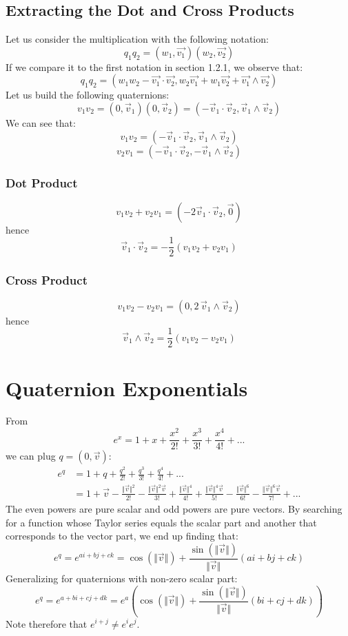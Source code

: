 \documentclass[10pt,a4paper]{article}
\begin{document}
\subsection{Extracting the Dot and Cross Products}
Let us consider the multiplication with the following notation: 
$$
q_1q_2 = (w_1,\vec{v_1})(w_2,\vec{v_2})
$$
If we compare it to the first notation in section 1.2.1, we observe that:
$$
\boxed{
q_1q_2 = (w_1w_2 - \vec{v_1}\cdot\vec{v_2}, w_2\vec{v_1} + w_1\vec{v_2} + \vec{v_1}\wedge\vec{v_2})
}
$$
Let us build the following quaternions:
$$
v_1v_2 = (0,\vec{v}_1)(0,\vec{v}_2) = (-\vec{v}_1\cdot\vec{v}_2, \vec{v}_1\wedge\vec{v}_2)
$$
We can see that:
$$
v_1v_2 = (-\vec{v}_1\cdot\vec{v}_2, \vec{v}_1\wedge\vec{v}_2)
$$
$$
v_2v_1 = (-\vec{v}_1\cdot\vec{v}_2, -\vec{v}_1\wedge\vec{v}_2)
$$
\subsubsection{Dot Product}
$$
v_1v_2 + v_2v_1 = (-2\vec{v}_1\cdot\vec{v}_2, \vec{0})
$$
hence
$$
\boxed{
\vec{v}_1\cdot\vec{v}_2 = -\frac{1}{2}(v_1v_2 + v_2v_1)
}
$$
\subsubsection{Cross Product}
$$
v_1v_2 - v_2v_1 = (0, 2\,\vec{v}_1\wedge\vec{v}_2)
$$
hence
$$
\boxed{
\vec{v}_1\wedge\vec{v}_2 = \frac{1}{2}(v_1v_2 - v_2v_1)
}
$$

\section{Quaternion Exponentials}
From 
$$
e^x = 1 + x + \frac{x^2}{2!} + \frac{x^3}{3!} + \frac{x^4}{4!} + ...
$$
we can plug $q = (0,\vec{v})$:
\begin{equation*}
\begin{aligned}
e^q &= 1 + q + \frac{q^2}{2!} + \frac{q^3}{3!} + \frac{q^4}{4!} + ... \\
&= 1 + \vec{v} - \frac{\Vert\vec{v}\Vert^2}{2!} - \frac{\Vert\vec{v}\Vert^2\vec{v}}{3!}
+ \frac{\Vert\vec{v}\Vert^4}{4!} + \frac{\Vert\vec{v}\Vert^4\vec{v}}{5!}
- \frac{\Vert\vec{v}\Vert^6}{6!} - \frac{\Vert\vec{v}\Vert^6\vec{v}}{7!} + ...
\end{aligned}
\end{equation*}
The even powers are pure scalar and odd powers are pure vectors. By searching for a function whose Taylor series equals the scalar part and another that corresponds to the vector part, we end up finding that: 
$$
e^q = e^{ai + bj + ck} = \cos(\Vert\vec{v}\Vert) + \frac{\sin(\Vert\vec{v}\Vert)}{\Vert\vec{v}\Vert}(ai + bj + ck)
$$
Generalizing for quaternions with non-zero scalar part: 
$$
\boxed{
e^q = e^{a + bi + cj + dk} = e^a\left(\cos(\Vert\vec{v}\Vert) + \frac{\sin(\Vert\vec{v}\Vert)}{\Vert\vec{v}\Vert}(bi + cj + dk)\right)
}
$$
Note therefore that $e^{i+j} \neq e^ie^j$.
\end{document}
